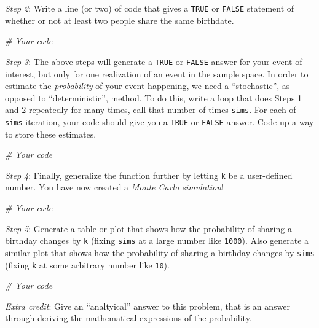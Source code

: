 \documentclass[]{book}
\newenvironment{Shaded}{\begin{snugshade}}{\end{snugshade}}
\newcommand{\CommentTok}[1]{\textcolor[rgb]{0.56,0.35,0.01}{\textit{#1}}}
\theoremstyle{definition}
\theoremstyle{definition}
\theoremstyle{definition}
\theoremstyle{remark}
\begin{document}
\emph{Step 2}: Write a line (or two) of code that gives a \texttt{TRUE}
or \texttt{FALSE} statement of whether or not at least two people share
the same birthdate.

\begin{Shaded}
\begin{Highlighting}[]
\CommentTok{# Your code}
\end{Highlighting}
\end{Shaded}

\emph{Step 3}: The above steps will generate a \texttt{TRUE} or
\texttt{FALSE} answer for your event of interest, but only for one
realization of an event in the sample space. In order to estimate the
\emph{probability} of your event happening, we need a ``stochastic'', as
opposed to ``deterministic'', method. To do this, write a loop that does
Steps 1 and 2 repeatedly for many times, call that number of times
\texttt{sims}. For each of \texttt{sims} iteration, your code should
give you a \texttt{TRUE} or \texttt{FALSE} answer. Code up a way to
store these estimates.

\begin{Shaded}
\begin{Highlighting}[]
\CommentTok{# Your code}
\end{Highlighting}
\end{Shaded}

\emph{Step 4}: Finally, generalize the function further by letting
\texttt{k} be a user-defined number. You have now created a \emph{Monte
Carlo simulation}!

\begin{Shaded}
\begin{Highlighting}[]
\CommentTok{# Your code}
\end{Highlighting}
\end{Shaded}

\emph{Step 5}: Generate a table or plot that shows how the probability
of sharing a birthday changes by \texttt{k} (fixing \texttt{sims} at a
large number like \texttt{1000}). Also generate a similar plot that
shows how the probability of sharing a birthday changes by \texttt{sims}
(fixing \texttt{k} at some arbitrary number like \texttt{10}).

\begin{Shaded}
\begin{Highlighting}[]
\CommentTok{# Your code}
\end{Highlighting}
\end{Shaded}

\emph{Extra credit}: Give an ``analtyical'' answer to this problem, that
is an answer through deriving the mathematical expressions of the
probability.
\end{document}

